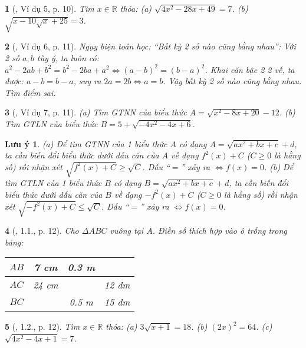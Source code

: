 \documentclass{article}
\newtheorem{baitoan}{}%
\newtheorem{luuy}{Lưu ý}
\begin{document}
\begin{baitoan}[\cite{Binh_boi_duong_Toan_9_tap_1}, Ví dụ 5, p. 10]
	Tìm $x\in\mathbb{R}$ thỏa: (a) $\sqrt{4x^2 - 28x + 49} = 7$. (b) $\sqrt{x - 10\sqrt{x} + 25} = 3$.
\end{baitoan}

\begin{baitoan}[\cite{Binh_boi_duong_Toan_9_tap_1}, Ví dụ 6, p. 11]
	Ngụy biện toán học: ``Bất kỳ 2 số nào cũng bằng nhau'': Với 2 số $a,b$ tùy ý, ta luôn có: $a^2 - 2ab + b^2 = b^2 - 2ba + a^2\Leftrightarrow(a - b)^2 = (b - a)^2$. Khai căn bậc 2 2 vế, ta được: $a - b = b - a$, suy ra $2a = 2b\Leftrightarrow a = b$. Vậy bất kỳ 2 số nào cũng bằng nhau. Tìm điểm sai.
\end{baitoan}

\begin{baitoan}[\cite{Binh_boi_duong_Toan_9_tap_1}, Ví dụ 7, p. 11]
	(a) Tìm {\rm GTNN} của biểu thức $A = \sqrt{x^2 - 8x + 20} - 12$. (b) Tìm {\rm GTLN} của biểu thức $B = 5 + \sqrt{-4x^2 - 4x + 6}$.
\end{baitoan}

\begin{luuy}
	(a) Để tìm {\rm GTNN} của 1 biểu thức $A$ có dạng $A = \sqrt{ax^2 + bx + c} + d$, ta cần biến đổi biểu thức dưới dấu căn của $A$ về dạng $f^2(x) + C$ ($C\ge0$ là hằng số) rồi nhận xét $\sqrt{f^2(x) + C}\ge\sqrt{C}$. Dấu ``$=$'' xảy ra $\Leftrightarrow f(x) = 0$. (b) Để tìm {\rm GTLN} của 1 biểu thức $B$ có dạng $B = \sqrt{ax^2 + bx + c} + d$, ta cần biến đổi biểu thức dưới dấu căn của $B$ về dạng $-f^2(x) + C$ ($C\ge0$  là hằng số) rồi nhận xét $\sqrt{-f^2(x) + C}\le\sqrt{C}$. Dấu ``$=$'' xảy ra $\Leftrightarrow f(x) = 0$.
\end{luuy}

\begin{baitoan}[\cite{Binh_boi_duong_Toan_9_tap_1}, 1.1., p. 12]
	Cho $\Delta ABC$ vuông tại $A$. Điền số thích hợp vào ô trống trong bảng:
	\begin{table}[H]
		\centering
		\begin{tabular}{|c|c|c|c|}
			\hline
			$AB$ & 7 cm & 0.3 m &  \\
			\hline
			$AC$ & 24 cm &  & 12 dm \\
			\hline
			$BC$ &  & 0.5 m & 15 dm \\
			\hline
		\end{tabular}
	\end{table}
\end{baitoan}

\begin{baitoan}[\cite{Binh_boi_duong_Toan_9_tap_1}, 1.2., p. 12]
	Tìm $x\in\mathbb{R}$ thỏa: (a) $3\sqrt{x + 1} = 18$. (b) $(2x)^2 = 64$. (c) $\sqrt{4x^2 - 4x + 1} = 7$.
\end{baitoan}
\end{document}
